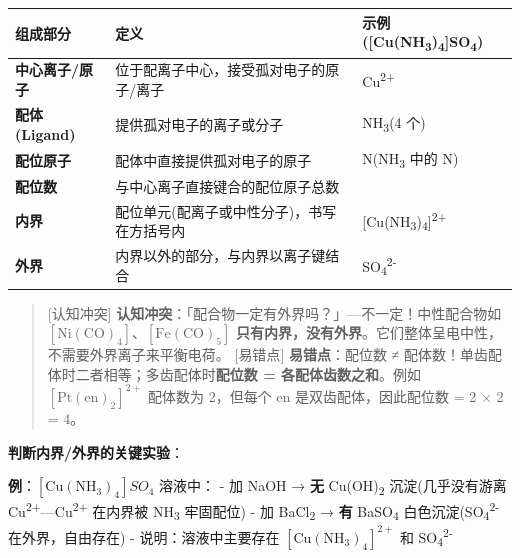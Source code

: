 {\def\LTcaptype{none} %
\begin{longtable}[]{@{}
  >{\raggedright\arraybackslash}p{}
  >{\raggedright\arraybackslash}p{}
  >{\raggedright\arraybackslash}p{}@{}}
\toprule\noalign{}
\begin{minipage}[b]{\linewidth}\raggedright
组成部分
\end{minipage} & \begin{minipage}[b]{\linewidth}\raggedright
定义
\end{minipage} & \begin{minipage}[b]{\linewidth}\raggedright
示例({[}Cu(NH\textsubscript{3})\textsubscript{4}{]}SO\textsubscript{4})
\end{minipage} \\
\midrule\noalign{}
\endhead
\bottomrule\noalign{}
\endlastfoot
\textbf{中心离子/原子} & 位于配离子中心，接受孤对电子的原子/离子 & Cu\textsuperscript{2+} \\
\textbf{配体 (Ligand)} & 提供孤对电子的离子或分子 & NH\textsubscript{3}(4 个) \\
\textbf{配位原子} & 配体中直接提供孤对电子的原子 & N(NH\textsubscript{3} 中的 N) \\
\textbf{配位数} & 与中心离子直接键合的配位原子总数 & 4 \\
\textbf{内界} & 配位单元(配离子或中性分子)，书写在方括号内 & {[}Cu(NH\textsubscript{3})\textsubscript{4}{]}\textsuperscript{2+} \\
\textbf{外界} & 内界以外的部分，与内界以离子键结合 & SO\textsubscript{4}\textsuperscript{2-} \\
\end{longtable}
}

\begin{quote}
{[}认知冲突{]} \textbf{认知冲突}：「配合物一定有外界吗？」---不一定！中性配合物如 \([\mathrm{Ni(CO)_4}]\)、\([\mathrm{Fe(CO)_5}]\) \textbf{只有内界，没有外界}。它们整体呈电中性，不需要外界离子来平衡电荷。
{[}易错点{]} \textbf{易错点}：配位数 ≠ 配体数！单齿配体时二者相等；多齿配体时\textbf{配位数 = 各配体齿数之和}。例如 \([\mathrm{Pt(en)_2}]^{2+}\) 配体数为 2，但每个 en 是双齿配体，因此配位数 = 2 × 2 = 4。
\end{quote}

\textbf{判断内界/外界的关键实验}：

\textbf{例}：\([\mathrm{Cu(NH_3)_4}]SO_4\) 溶液中：
- 加 NaOH → \textbf{无} Cu(OH)\textsubscript{2} 沉淀(几乎没有游离 Cu\textsuperscript{2+}---Cu\textsuperscript{2+} 在内界被 NH\textsubscript{3} 牢固配位)
- 加 BaCl\textsubscript{2} → \textbf{有} BaSO\textsubscript{4} 白色沉淀(SO\textsubscript{4}\textsuperscript{2-} 在外界，自由存在)
- 说明：溶液中主要存在 \([\mathrm{Cu(NH_3)_4}]^{2+}\) 和 SO\textsubscript{4}\textsuperscript{2-}

